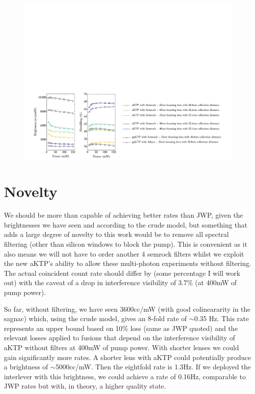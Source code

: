 \documentclass[aps,floatfix,superscriptaddress,onecolumn,tightenlines,amsmath,amssymb,nofootinbib,raggedbottom,nobalancelastpage,10pt]{revtex4-2}
\begin{document}
\begin{figure}[h] \vspace{2em}
    \begin{center}
    \includegraphics[width=16cm]{figures_detectorModel/heraldingBrightnessFocus.pdf}
    \end{center}\vspace{-1em}    
\end{figure}

\section*{Novelty} 

We should be more than capable of achieving better rates than JWP, given the brightnesses we have seen and according to the crude model, but something that adds a large degree of novelty to this work would be to remove all spectral filtering (other than silicon windows to block the pump). This is convenient as it also means we will not have to order another 4 semrock filters whilst we exploit the new aKTP's ability to allow these multi-photon experiments without filtering. The actual coincident count rate should differ by (some percentage I will work out) with the caveat of a drop in interference visibility of 3.7\% (at 400mW of pump power). 

\vspace{1em}

So far, without filtering, we have seen 3600cc/mW (with good colineararity in the sagnac) which, using the crude model, gives an 8-fold rate of $\sim$0.35 Hz. This rate represents an upper bound based on 10\% loss (same as JWP quoted) and the relevant losses applied to fusions that depend on the interference visibility of aKTP without filters at 400mW of pump power. With shorter lenses we could gain significantly more rates. A shorter lens with aKTP could potentially produce a brightness of  $\sim$5000cc/mW. Then the eightfold rate is 1.3Hz. If we deployed the interlever with this brightness, we could achieve a rate of 0.16Hz, comparable to JWP rates but with, in theory, a higher quality state. 
\end{document}
